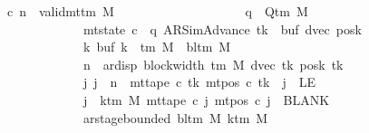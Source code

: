 \begin{isabellebody}
\ \ \ \ \ \ \ \ {\isachardoublequoteopen}{\isasymAnd}c{}{\isacharprime}{\kern0pt}\ n{\isachardot}{\kern0pt}\ {\isasymlbrakk}\ valid{\isacharunderscore}{\kern0pt}mttm\ M{\isacharsemicolon}{\kern0pt}\isanewline
\ \ \ \ \ \ \ \ \ \ \ \ \ \ \ \ \ \ \ \ q\ {\isasymin}\ Q{\isacharunderscore}{\kern0pt}tm\ M{\isacharsemicolon}{\kern0pt}\isanewline
\ \ \ \ \ \ \ \ \ \ \ \ \ \ \ \ \ \ \ \ mt{\isacharunderscore}{\kern0pt}state\ c{}{\isacharprime}{\kern0pt}\ {\isacharequal}{\kern0pt}\ {\isacharparenleft}{\kern0pt}q{\isacharcomma}{\kern0pt}\ AR{\isacharunderscore}{\kern0pt}SimAdvance{\isacharcomma}{\kern0pt}\ tk{\isacharcomma}{\kern0pt}\ {}{\isacharcomma}{\kern0pt}\ buf{\isacharcomma}{\kern0pt}\ dvec{\isacharcomma}{\kern0pt}\ posk{\isacharparenright}{\kern0pt}{\isacharsemicolon}{\kern0pt}\isanewline
\ \ \ \ \ \ \ \ \ \ \ \ \ \ \ \ \ \ \ \ {\isasymforall}k{\isachardot}{\kern0pt}\ buf\ k\ {\isasymin}\ {\isasymGamma}{\isacharunderscore}{\kern0pt}tm\ M\ {\isasymunion}\ {\isacharbraceleft}{\kern0pt}bl{\isacharunderscore}{\kern0pt}tm\ M{\isacharbraceright}{\kern0pt}{\isacharsemicolon}{\kern0pt}\isanewline
\ \ \ \ \ \ \ \ \ \ \ \ \ \ \ \ \ \ \ \ n\ {\isacharless}{\kern0pt}\ ar{\isacharunderscore}{\kern0pt}disp\ {\isacharparenleft}{\kern0pt}block{\isacharunderscore}{\kern0pt}width\ {\isacharparenleft}{\kern0pt}{\isasymGamma}{\isacharunderscore}{\kern0pt}tm\ M{\isacharparenright}{\kern0pt}{\isacharparenright}{\kern0pt}\ {\isacharparenleft}{\kern0pt}dvec\ tk{\isacharparenright}{\kern0pt}\ {\isacharparenleft}{\kern0pt}posk\ tk{\isacharparenright}{\kern0pt}{\isacharsemicolon}{\kern0pt}\isanewline
\ \ \ \ \ \ \ \ \ \ \ \ \ \ \ \ \ \ \ \ {\isasymAnd}j{\isachardot}{\kern0pt}\ j\ {\isacharless}{\kern0pt}\ n\ {\isasymLongrightarrow}\ mt{\isacharunderscore}{\kern0pt}tape\ c{}{\isacharprime}{\kern0pt}\ tk\ {\isacharparenleft}{\kern0pt}mt{\isacharunderscore}{\kern0pt}pos\ c{}{\isacharprime}{\kern0pt}\ tk\ {\isacharminus}{\kern0pt}\ j{\isacharparenright}{\kern0pt}\ {\isasymnoteq}\ LE{}{\isacharsemicolon}{\kern0pt}\isanewline
\ \ \ \ \ \ \ \ \ \ \ \ \ \ \ \ \ \ \ \ {\isasymforall}j\ {\isasymge}\ k{\isacharunderscore}{\kern0pt}tm\ M{\isachardot}{\kern0pt}\ mt{\isacharunderscore}{\kern0pt}tape\ c{}{\isacharprime}{\kern0pt}\ j\ {\isacharparenleft}{\kern0pt}mt{\isacharunderscore}{\kern0pt}pos\ c{}{\isacharprime}{\kern0pt}\ j{\isacharparenright}{\kern0pt}\ {\isacharequal}{\kern0pt}\ BLANK{}{\isacharsemicolon}{\kern0pt}\isanewline
\ \ \ \ \ \ \ \ \ \ \ \ \ \ \ \ \ \ \ \ ar{\isacharunderscore}{\kern0pt}stage{\isacharunderscore}{\kern0pt}bounded\ {\isacharparenleft}{\kern0pt}bl{\isacharunderscore}{\kern0pt}tm\ M{\isacharparenright}{\kern0pt}\ {\isacharparenleft}{\kern0pt}k{\isacharunderscore}{\kern0pt}tm\ M{\isacharparenright}{\kern0pt}\isanewline

\end{isabellebody}
